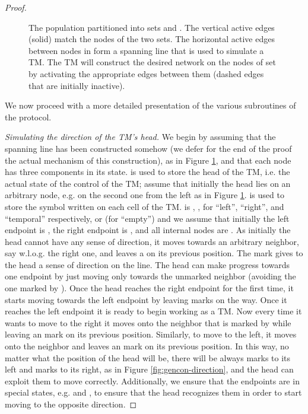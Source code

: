 \documentclass[oribibl, 11pt]{llncs}
\begin{document}
\begin{proof}
\begin{figure}[!hbtp]
\caption{The population partitioned into sets  and . The vertical active edges (solid) match the nodes of the two sets. The horizontal active edges between nodes in  form a spanning line that is used to simulate a TM. The TM will construct the desired network on the nodes of set  by activating the appropriate edges between them (dashed edges that are initially inactive).} \label{fig:gencon-overview}
\end{figure}  

We now proceed with a more detailed presentation of the various subroutines of the protocol.

\noindent\emph{Simulating the direction of the TM's head.} We begin by assuming that the spanning line has been constructed somehow (we defer for the end of the proof the actual mechanism of this construction), as in Figure \ref{fig:gencon-overview}, and that each node has three components  in its state.  is used to store the head of the TM, i.e. the actual state of the control of the TM; assume that initially the head lies on an arbitrary node, e.g. on the second one from the left as in Figure \ref{fig:gencon-overview}.  is used to store the symbol written on each cell of the TM.  is , ,  for ``left'', ``right'', and ``temporal'' respectively, or  (for ``empty'') and we assume that initially the left endpoint is , the right endpoint is , and all internal nodes are . As initially the head cannot have any sense of direction, it moves towards an arbitrary neighbor, say w.l.o.g. the right one, and leaves a  on its previous position. The  mark gives to the head a sense of direction on the line. The head can make progress towards one endpoint by just moving only towards the unmarked neighbor (avoiding the one marked by ). Once the head reaches the right endpoint for the first time, it starts moving towards the left endpoint by leaving  marks on the way. Once it reaches the left endpoint it is ready to begin working as a TM. Now every time it wants to move to the right it moves onto the neighbor that is marked by  while leaving an  mark on its previous position. Similarly, to move to the left, it moves onto the  neighbor and leaves an  mark on its previous position. In this way, no matter what the position of the head will be, there will be always  marks to its left and  marks to its right, as in Figure \ref{fig:gencon-direction}, and the head can exploit them to move correctly. Additionally, we ensure that the endpoints are in special states, e.g.  and , to ensure that the head recognizes them in order to start moving to the opposite direction.  


\end{proof}
\end{document}

